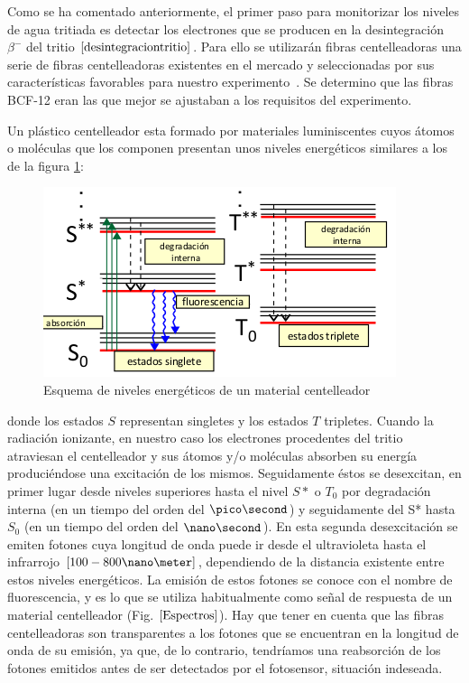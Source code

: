 Como se ha comentado anteriormente, el primer paso para monitorizar los niveles de agua tritiada es detectar los electrones que se producen en la desintegración $\beta^-$ del tritio $\eqref{desintegraciontritio}$. Para ello se utilizarán fibras centelleadoras una serie de fibras centelleadoras existentes en el mercado y seleccionadas por sus características favorables para nuestro experimento~\cite{Alberto}.  Se determino que las fibras BCF-12 eran las que mejor se ajustaban a los requisitos del experimento. 

Un plástico centelleador esta formado por materiales luminiscentes cuyos átomos o moléculas que los componen presentan unos niveles energéticos similares a los de la figura \ref{Esquemafibras}:

\begin{figure}[hbtp]
\centering
\includegraphics[scale=0.7]{EsquemaNivelesFIbras.png}
\caption{Esquema de niveles energéticos de un material centelleador~\cite{asignatura}\label{Esquemafibras}
}
\end{figure}
donde los estados $S$ representan singletes y los estados $T$ tripletes. Cuando la radiación ionizante, en nuestro caso los electrones procedentes del tritio  atraviesan el centelleador  y sus átomos y/o moléculas absorben su energía produciéndose una excitación de los mismos. 
Seguidamente éstos se desexcitan, en primer lugar desde niveles superiores hasta el nivel $S*$ o $T_0$ por degradación interna (en un tiempo del orden del $\pico\second$) y seguidamente del S* hasta $S_0$ (en un tiempo del orden del $\nano\second$). En esta segunda desexcitación se emiten fotones cuya longitud de onda puede ir desde el ultravioleta hasta el infrarrojo $[100-800 \nano\meter]$, dependiendo de la distancia existente entre estos niveles energéticos. La emisión de estos fotones se conoce con el nombre de  fluorescencia, y es lo que se utiliza habitualmente como señal de respuesta de un material centelleador (Fig. $\ref{Espectros}$).
Hay que tener en cuenta que las fibras centelleadoras son transparentes a los fotones que se encuentran en la longitud de onda de su emisión, ya que, de lo contrario, tendríamos una reabsorción de los fotones emitidos antes de ser detectados por el fotosensor, situación indeseada.


